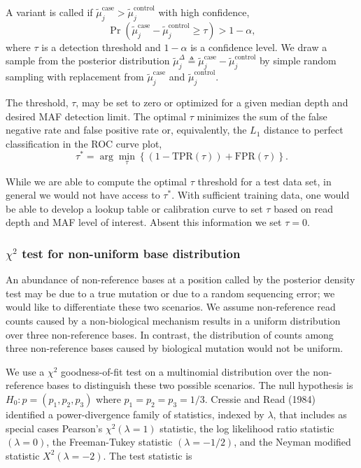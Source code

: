 \documentclass[11pt,reqno]{amsart}
\begin{document}
A variant is called if $\tilde{\mu}_j^{\text{case}} > \tilde{\mu}_j^{\text{control}}$ with high confidence,
\begin{equation}\label{eqn:bayes_test}
	\Pr( \tilde{\mu}_j^{\text{case}} - \tilde{\mu}_j^{\text{control}} \geq \tau ) > 1-\alpha,
\end{equation}
where $\tau$ is a detection threshold and $1-\alpha$ is a confidence level. We draw a sample from the posterior distribution $\tilde{\mu}_j^{\Delta} \triangleq \tilde{\mu}_j^{\text{case}} - \tilde{\mu}_j^{\text{control}}$ by simple random sampling with replacement from $\tilde{\mu}_j^{\text{case}}$ and $\tilde{\mu}_j^{\text{control}}$.

The threshold, $\tau$, may be set to zero or optimized for a given median depth and desired MAF detection limit. The optimal $\tau$ minimizes the sum of the false negative rate and false positive rate or, equivalently,  the $L_1$ distance to perfect classification in the ROC curve plot,
\begin{equation}
	\tau^* = \arg\min_\tau \left\{ (1-\text{TPR}(\tau)) + \text{FPR}(\tau) \right\}.
\end{equation}

While we are able to compute the optimal $\tau$ threshold for a test data set, in general we would not have access to $\tau^*$. With sufficient training data, one would be able to develop a lookup table or calibration curve to set $\tau$ based on read depth and MAF level of interest. Absent this information we set $\tau = 0$.


\subsubsection{$\chi^2$ test for non-uniform base distribution}

An abundance of non-reference bases at a position called by the posterior density test may be due to a true mutation or due to a random sequencing error; we would like to differentiate these two scenarios. We assume non-reference read counts caused by a non-biological mechanism results in a uniform distribution over three non-reference bases. In contrast, the distribution of counts among three non-reference bases caused by biological mutation would not be uniform.

We use a $\chi^2$ goodness-of-fit test on a multinomial distribution over the non-reference bases to distinguish these two possible scenarios. The null hypothesis is $H_0: p = (p_1, p_2, p_3)$ where $p_1=p_2=p_3=1/3$. Cressie and Read (1984) identified a power-divergence family of statistics, indexed by $\lambda$, that includes as special cases Pearson's $\chi^2 (\lambda = 1)$ statistic, the log likelihood ratio statistic $(\lambda = 0)$, the Freeman-Tukey statistic $(\lambda = -1/2)$, and the Neyman modified statistic $X^2 (\lambda = -2)$. The test statistic is
\end{document}
